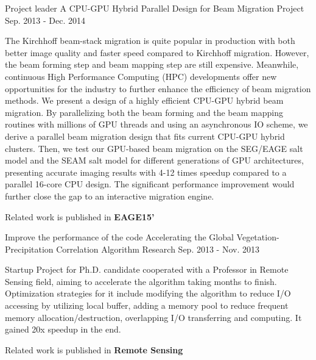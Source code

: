 \documentclass[11pt, a4paper]{awesome-cv}
\begin{document}
\begin{cventries}
  \cventry
    {Project leader} %
    {A CPU-GPU Hybrid Parallel Design for Beam Migration} %
    {Project} %
    {Sep. 2013 - Dec. 2014} %
    {
      \begin{cvitems} %
        \item {The Kirchhoff beam-stack migration is quite popular in production with both better image quality and faster speed compared to Kirchhoff migration.  However, the beam forming step and beam mapping step are still expensive. Meanwhile, continuous High Performance Computing (HPC) developments offer new opportunities for the industry to further enhance the efficiency of beam migration methods. We present a design of a highly efficient CPU-GPU hybrid beam migration.  By parallelizing both the beam forming and the beam mapping routines with millions of GPU threads and using an asynchronous IO scheme, we derive a parallel beam migration design that fits current CPU-GPU hybrid clusters.  Then, we test our GPU-based beam migration on the SEG/EAGE salt model and the SEAM salt model for different generations of GPU architectures, presenting accurate imaging results with 4-12 times speedup compared to a parallel 16-core CPU design. The significant performance improvement would further close the gap to an interactive migration engine.}
        \item {Related work is published in \textbf{EAGE15'}}
      \end{cvitems}
    }
    
  \cventry
    {Improve the performance of the code} %
    {Accelerating the Global Vegetation-Precipitation Correlation Algorithm} %
    {Research} %
    {Sep. 2013 - Nov. 2013} %
    {
      \begin{cvitems} %
        \item {Startup Project for Ph.D. candidate cooperated with a Professor in Remote Sensing field, aiming to accelerate the algorithm taking months to finish. Optimization strategies for it include modifying the algorithm to reduce I/O accessing by utilizing local buffer, adding a memory pool to reduce frequent memory allocation/destruction, overlapping I/O transferring and computing. It gained 20x speedup in the end.}
        \item {Related work is published in \textbf{Remote Sensing}}
      \end{cvitems}
    }

\end{cventries}
\end{document}
